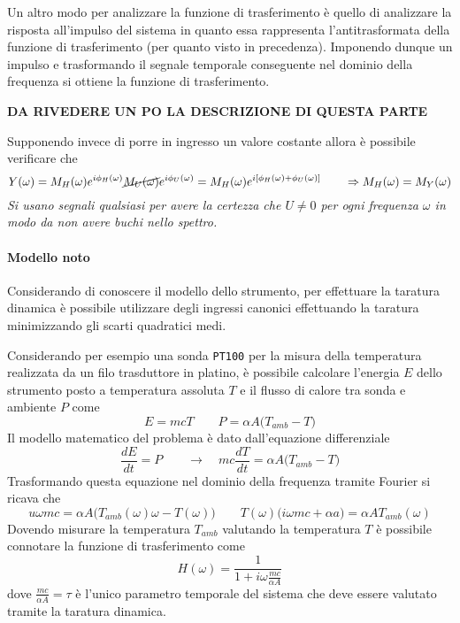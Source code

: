 	Un altro modo per analizzare la funzione di trasferimento è quello di analizzare la risposta all'impulso del sistema in quanto essa rappresenta l'antitrasformata della funzione di trasferimento (per quanto visto in precedenza). Imponendo dunque un impulso e trasformando il segnale temporale conseguente nel dominio della frequenza si ottiene la funzione di trasferimento.
	
	\vspace{3mm}
	\textbf{DA RIVEDERE UN PO LA DESCRIZIONE DI QUESTA PARTE}
	
	Supponendo invece di porre in ingresso un valore costante allora è possibile verificare che
	\[ Y(\omega) = M_H( \omega) e^{i\phi_H(\omega)} \cancel{M_U(\omega)} e^{i\phi_U(\omega)} = M_H(\omega) e^{i \left[ \phi_H(\omega) + \phi_U(\omega) \right]}  \qquad \Rightarrow M_H(\omega) =M_Y(\omega)	\]
	\textit{Si usano segnali qualsiasi per avere la certezza che $U\neq0$ per ogni frequenza $\omega$ in modo da non avere buchi nello spettro.}
	
	
	
	\paragraph{Modello noto} Considerando di conoscere il modello dello strumento, per effettuare la taratura dinamica è possibile utilizzare degli ingressi canonici effettuando la taratura minimizzando gli scarti quadratici medi.
	
	Considerando per esempio una sonda \texttt{PT100} per la misura della temperatura realizzata da un filo trasduttore in platino, è possibile calcolare l'energia $E$ dello strumento posto a temperatura assoluta $T$ e il flusso di calore tra sonda e ambiente $P$ come
	\[E=mc T \qquad P = \alpha A \big(T_{amb} - T\big) \]
	Il modello matematico del problema è dato dall'equazione differenziale
	\[ \frac{dE}{dt} = P \qquad \rightarrow \quad mc \frac {dT}{dt} = \alpha A \big(T_{amb} - T \big)  \]
	Trasformando questa equazione nel dominio della frequenza tramite Fourier si ricava che
	\[ u\omega m c = \alpha A \big(T_{amb}(\omega) \omega -T(\omega)\big) \qquad T(\omega) \big(i\omega m c + \alpha a\big) = \alpha A T_{amb}(\omega)\]
	Dovendo misurare la temperatura $T_{amb}$ valutando la temperatura $T$ è possibile connotare la funzione di trasferimento come
	\[ H(\omega) = \frac 1 {1 + i\omega \frac{mc}{\alpha A}}\]
	dove $\frac{mc}{\alpha A} = \tau$ è l'unico parametro temporale del sistema che deve essere valutato tramite la taratura dinamica.
	
